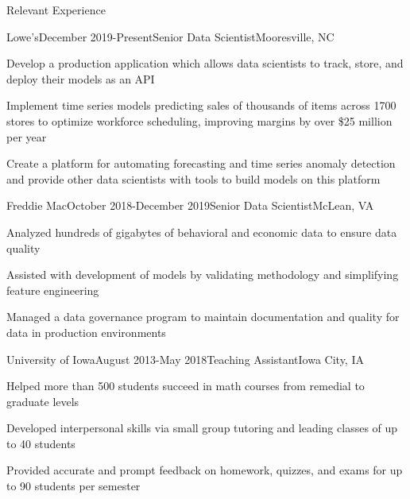 \documentclass[hidelinks]{resume} %
\begin{document}
\begin{rSection}{Relevant Experience}

\begin{rSubsection}{Lowe's}{December 2019-Present}{Senior Data Scientist}{Mooresville, NC}
\item Develop a production application which allows data scientists to track, store, and deploy their models as an API
\item Implement time series models predicting sales of thousands of items across 1700 stores to optimize workforce scheduling, improving margins by over \$25 million per year
\item Create a platform for automating forecasting and time series anomaly detection and provide other data scientists with tools to build models on this platform
\end{rSubsection}

\begin{rSubsection}{Freddie Mac}{October 2018-December 2019}{Senior Data Scientist}{McLean, VA}
\item Analyzed hundreds of gigabytes of behavioral and economic data to ensure data quality
\item Assisted with development of models by validating methodology and simplifying feature engineering
\item Managed a data governance program to maintain documentation and quality for data in production environments
\end{rSubsection}


\begin{rSubsection}{University of Iowa}{August 2013-May 2018}{Teaching Assistant}{Iowa City, IA}
\item Helped more than 500 students succeed in math courses from remedial to graduate levels
\item Developed interpersonal skills via small group tutoring and leading classes of up to 40 students
\item Provided accurate and prompt feedback on homework, quizzes, and exams for up to 90 students per semester
\end{rSubsection}


\end{rSection}
\end{document}
